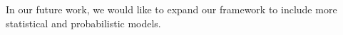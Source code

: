 
In our future work, we would like to expand our framework to include more statistical and probabilistic models.
